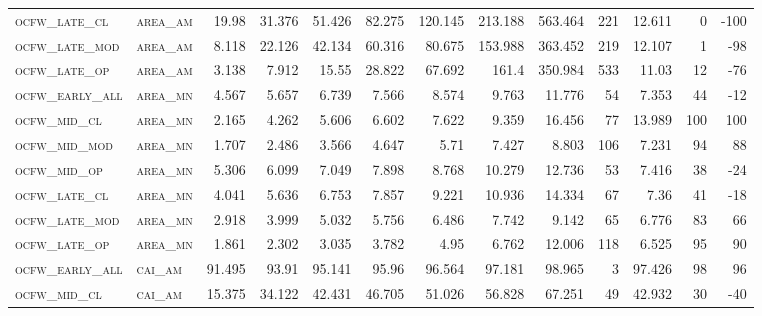 \begin{landscape}
\begin{center}
\begin{footnotesize}
\begin{longtable}{llrrrrrrrr|rrr}
\textsc{ocfw\_late\_cl  } & \textsc{area\_am  }   & 19.98    & 31.376   & 51.426   & 82.275   & 120.145  & 213.188  & 563.464  & 221    & 12.611        & 0             & -100            \\
\textsc{ocfw\_late\_mod } & \textsc{area\_am  }   & 8.118    & 22.126   & 42.134   & 60.316   & 80.675   & 153.988  & 363.452  & 219    & 12.107        & 1             & -98             \\
\textsc{ocfw\_late\_op  } & \textsc{area\_am  }   & 3.138    & 7.912    & 15.55    & 28.822   & 67.692   & 161.4    & 350.984  & 533    & 11.03         & 12            & -76             \\
\textsc{ocfw\_early\_all} & \textsc{area\_mn  }   & 4.567    & 5.657    & 6.739    & 7.566    & 8.574    & 9.763    & 11.776   & 54     & 7.353         & 44            & -12             \\
\textsc{ocfw\_mid\_cl   } & \textsc{area\_mn  }   & 2.165    & 4.262    & 5.606    & 6.602    & 7.622    & 9.359    & 16.456   & 77     & 13.989        & 100           & 100             \\
\textsc{ocfw\_mid\_mod  } & \textsc{area\_mn  }   & 1.707    & 2.486    & 3.566    & 4.647    & 5.71     & 7.427    & 8.803    & 106    & 7.231         & 94            & 88              \\
\textsc{ocfw\_mid\_op   } & \textsc{area\_mn  }   & 5.306    & 6.099    & 7.049    & 7.898    & 8.768    & 10.279   & 12.736   & 53     & 7.416         & 38            & -24             \\
\textsc{ocfw\_late\_cl  } & \textsc{area\_mn  }   & 4.041    & 5.636    & 6.753    & 7.857    & 9.221    & 10.936   & 14.334   & 67     & 7.36          & 41            & -18             \\
\textsc{ocfw\_late\_mod } & \textsc{area\_mn  }   & 2.918    & 3.999    & 5.032    & 5.756    & 6.486    & 7.742    & 9.142    & 65     & 6.776         & 83            & 66              \\
\textsc{ocfw\_late\_op  } & \textsc{area\_mn  }   & 1.861    & 2.302    & 3.035    & 3.782    & 4.95     & 6.762    & 12.006   & 118    & 6.525         & 95            & 90              \\
\textsc{ocfw\_early\_all} & \textsc{cai\_am   }   & 91.495   & 93.91    & 95.141   & 95.96    & 96.564   & 97.181   & 98.965   & 3      & 97.426        & 98            & 96              \\
\textsc{ocfw\_mid\_cl   } & \textsc{cai\_am   }   & 15.375   & 34.122   & 42.431   & 46.705   & 51.026   & 56.828   & 67.251   & 49     & 42.932        & 30            & -40             \\

\end{longtable}
\end{footnotesize}
\end{center}
\end{landscape}
